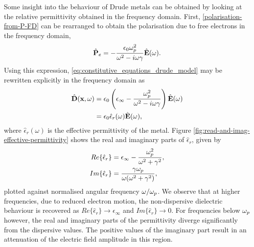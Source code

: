 Some insight into the behaviour of Drude metals can be obtained by looking at the relative permittivity obtained in the frequency domain. First, \eqref{polarisation-from-P-FD} can be rearranged to obtain the polarisation due to free electrons in the frequency domain,
\begin{equation}
\hat{\mathbf{P}}_e = - \frac{\epsilon_0 \omega_p^2}{\omega^2 - i \omega \gamma } \hat{\mathbf{E}}(\omega) .
  \label{eq:polarization-field-freq-domain}
\end{equation}
Using this expression, \eqref{eq:constitutive_equations_drude_model} may be rewritten explicitly in the frequency domain as
\begin{equation}
    \begin{split}
    \hat{\mathbf{D}}(\mathbf{x},\omega) &= \epsilon_0 \left( \epsilon_{\infty} - \frac{\omega_p^2 }{\omega^2 - i \omega \gamma } \right) \hat{\mathbf{E}}(\omega) \\
                                        &= \epsilon_0 \hat{\epsilon}_r (\omega) \hat{\mathbf{E}}(\omega) ,
    \end{split}
\end{equation}
where $\hat{\epsilon}_r(\omega)$ is the effective permittivity of the metal. Figure \ref{fig:read-and-imag-effective-permittivity} shows the real and imaginary parts of $\hat{\epsilon}_r$, given by
\begin{subequations}
\begin{align}
    Re\{ \hat{\epsilon}_r \} &= \epsilon_{\infty} - \frac{\omega_p^2}{\omega^2 + \gamma^2}, \\
    Im\{ \hat{\epsilon}_r \} &= \frac{\gamma \omega_p}{\omega ( \omega^2 + \gamma^2) } ,
\end{align}
\end{subequations}
plotted against normalised angular frequency $\omega / \omega_p$. We observe that at higher frequencies, due to reduced electron motion, the non-dispersive dielectric behaviour is recovered as $Re\{\hat{\epsilon}_r\} \to \epsilon_{\infty}$ and $Im\{\hat{\epsilon}_r\} \to 0$. For frequencies below $\omega_p$ however, the real and imaginary parts of the permittivity diverge significantly from the dispersive values. The positive values of the imaginary part result in an attenuation of the electric field amplitude in this region.

